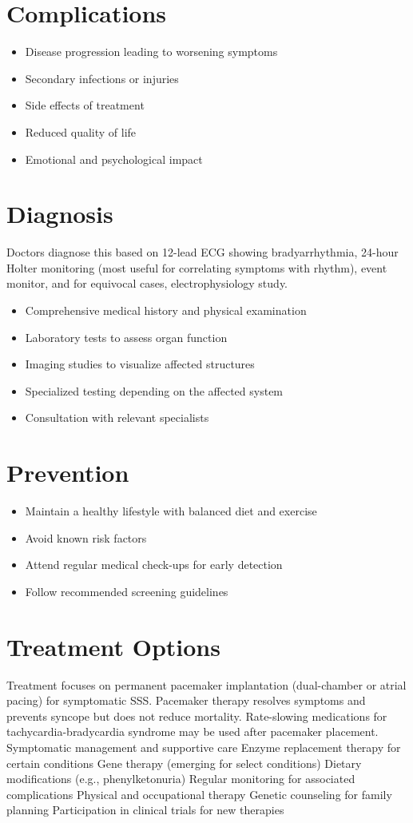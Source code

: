 \section{Complications}
\begin{itemize}[noitemsep]
  \item Disease progression leading to worsening symptoms
  \item Secondary infections or injuries
  \item Side effects of treatment
  \item Reduced quality of life
  \item Emotional and psychological impact
\end{itemize}
\section{Diagnosis}
Doctors diagnose this based on 12-lead ECG showing bradyarrhythmia, 24-hour Holter monitoring (most useful for correlating symptoms with rhythm), event monitor, and for equivocal cases, electrophysiology study.

\begin{itemize}[noitemsep]
  \item Comprehensive medical history and physical examination
  \item Laboratory tests to assess organ function
  \item Imaging studies to visualize affected structures
  \item Specialized testing depending on the affected system
  \item Consultation with relevant specialists
\end{itemize}
\section{Prevention}
\begin{itemize}[noitemsep]
  \item Maintain a healthy lifestyle with balanced diet and exercise
  \item Avoid known risk factors
  \item Attend regular medical check-ups for early detection
  \item Follow recommended screening guidelines
\end{itemize}
\section{Treatment Options}
Treatment focuses on permanent pacemaker implantation (dual-chamber or atrial pacing) for symptomatic SSS. Pacemaker therapy resolves symptoms and prevents syncope but does not reduce mortality. Rate-slowing medications for tachycardia-bradycardia syndrome may be used after pacemaker placement. Symptomatic management and supportive care Enzyme replacement therapy for certain conditions Gene therapy (emerging for select conditions) Dietary modifications (e.g., phenylketonuria) Regular monitoring for associated complications Physical and occupational therapy Genetic counseling for family planning Participation in clinical trials for new therapies

